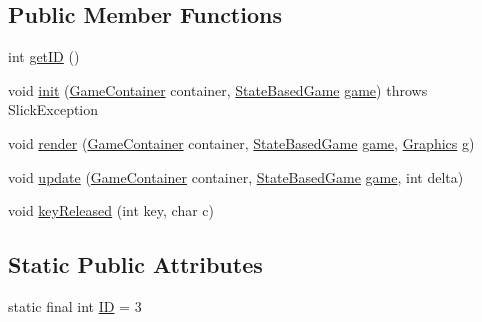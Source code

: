 \subsection*{Public Member Functions}
\begin{DoxyCompactItemize}
\item 
int \mbox{\hyperlink{classorg_1_1newdawn_1_1slick_1_1tests_1_1states_1_1_test_state3_a0cd328d3f5ef77423e54e7e51ff87dab}{get\+ID}} ()
\item 
void \mbox{\hyperlink{classorg_1_1newdawn_1_1slick_1_1tests_1_1states_1_1_test_state3_ad83c2a6d037e5d73d45f0ffea9d332cc}{init}} (\mbox{\hyperlink{classorg_1_1newdawn_1_1slick_1_1_game_container}{Game\+Container}} container, \mbox{\hyperlink{classorg_1_1newdawn_1_1slick_1_1state_1_1_state_based_game}{State\+Based\+Game}} \mbox{\hyperlink{classorg_1_1newdawn_1_1slick_1_1tests_1_1states_1_1_test_state3_a769f07538782627db0be9ce0043b356f}{game}})  throws Slick\+Exception 
\item 
void \mbox{\hyperlink{classorg_1_1newdawn_1_1slick_1_1tests_1_1states_1_1_test_state3_a15616ab5da1b4ec709f5940530906270}{render}} (\mbox{\hyperlink{classorg_1_1newdawn_1_1slick_1_1_game_container}{Game\+Container}} container, \mbox{\hyperlink{classorg_1_1newdawn_1_1slick_1_1state_1_1_state_based_game}{State\+Based\+Game}} \mbox{\hyperlink{classorg_1_1newdawn_1_1slick_1_1tests_1_1states_1_1_test_state3_a769f07538782627db0be9ce0043b356f}{game}}, \mbox{\hyperlink{classorg_1_1newdawn_1_1slick_1_1_graphics}{Graphics}} g)
\item 
void \mbox{\hyperlink{classorg_1_1newdawn_1_1slick_1_1tests_1_1states_1_1_test_state3_aa709ad4d618f9801bc5016acba14de95}{update}} (\mbox{\hyperlink{classorg_1_1newdawn_1_1slick_1_1_game_container}{Game\+Container}} container, \mbox{\hyperlink{classorg_1_1newdawn_1_1slick_1_1state_1_1_state_based_game}{State\+Based\+Game}} \mbox{\hyperlink{classorg_1_1newdawn_1_1slick_1_1tests_1_1states_1_1_test_state3_a769f07538782627db0be9ce0043b356f}{game}}, int delta)
\item 
void \mbox{\hyperlink{classorg_1_1newdawn_1_1slick_1_1tests_1_1states_1_1_test_state3_ae86e8703517f69bd92b44b4cebeac8fc}{key\+Released}} (int key, char c)
\end{DoxyCompactItemize}
\subsection*{Static Public Attributes}
\begin{DoxyCompactItemize}
\item 
static final int \mbox{\hyperlink{classorg_1_1newdawn_1_1slick_1_1tests_1_1states_1_1_test_state3_aa6764107cd40c552a44fae60571ad04f}{ID}} = 3
\end{DoxyCompactItemize}
